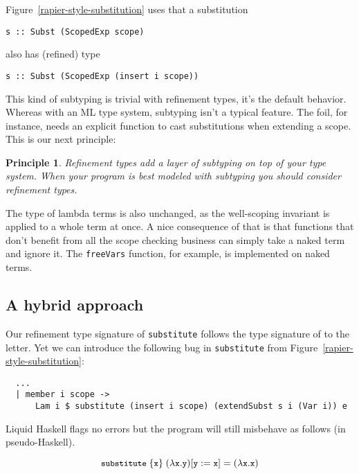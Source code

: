 \documentclass[sigconf, anonymous, review]{acmart}
\newcommand{\tc}[1]{{\small\texttt{#1}}}
\newcommand{\codeblocksize}{\fontsize{6.5}{9}\selectfont}
\newtheorem{principle}{Principle}
\begin{document}
Figure~\ref{rapier-style-substitution} uses that a substitution
\begin{verbatim}
s :: Subst (ScopedExp scope)
\end{verbatim}
also has (refined) type
\begin{verbatim}
s :: Subst (ScopedExp (insert i scope))
\end{verbatim}
This kind of subtyping is trivial with refinement types, it's the default
behavior. Whereas with an ML type system, subtyping isn't a typical feature. The
foil, for instance, needs an explicit function to cast substitutions when
extending a scope. This is our next principle:
\begin{principle}
  Refinement types add a layer of subtyping on top of your type system. When
  your program is best modeled with subtyping you should consider refinement
  types.
\end{principle}

The type of lambda terms is also unchanged, as the well-scoping invariant is
applied to a whole term at once. A nice consequence of that is that functions
that don't benefit from all the scope checking business can simply take a naked
term and ignore it. The \tc{freeVars} function, for example, is implemented on
naked terms.

\subsection{A hybrid approach}
\label{ensuring-the-scope-set-is-checked}

Our refinement type signature of \tc{substitute} follows the type signature of
\citeauthor{maclaurin23} to the letter.
Yet we can introduce the following bug in \tc{substitute} from
Figure~\ref{rapier-style-substitution}:
\begin{verbatim}
  ...
  | member i scope ->
      Lam i $ substitute (insert i scope) (extendSubst s i (Var i)) e
\end{verbatim}
Liquid Haskell flags no errors but the program will still misbehave as
follows (in pseudo-Haskell).

$$\codeblocksize{\tc{substitute}~\{\tc{x}\}~(\lambda{}\tc{x}. \tc{y}) [\tc{y}:=\tc{x}] = (\lambda{}\tc{x}. \tc{x})}$$
\end{document}
